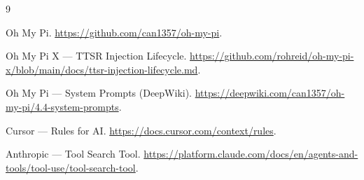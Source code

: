 \documentclass[11pt]{article}
\begin{document}
\begin{thebibliography}{9}

Oh My Pi.
\newblock \url{https://github.com/can1357/oh-my-pi}.

Oh My Pi X --- TTSR Injection Lifecycle.
\newblock \url{https://github.com/rohreid/oh-my-pi-x/blob/main/docs/ttsr-injection-lifecycle.md}.

Oh My Pi --- System Prompts (DeepWiki).
\newblock \url{https://deepwiki.com/can1357/oh-my-pi/4.4-system-prompts}.

Cursor --- Rules for AI.
\newblock \url{https://docs.cursor.com/context/rules}.

Anthropic --- Tool Search Tool.
\newblock \url{https://platform.claude.com/docs/en/agents-and-tools/tool-use/tool-search-tool}.

\end{thebibliography}
\end{document}
